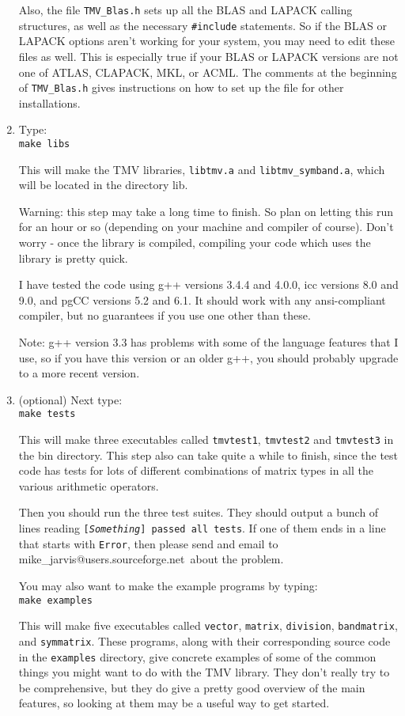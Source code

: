 \documentclass[twoside,letterpaper,11pt]{article}
\makeatletter
\renewcommand{\tt}[1]{{\texttt {#1}}}
\newcommand{\myemail}{mike\_jarvis@users.sourceforge.net}
\makeatother
\begin{document}
\begin{enumerate}
Also, the file \tt{TMV\_Blas.h} sets up all the BLAS and LAPACK calling structures,
as well as the necessary \tt{\#include} statements.  
So if the BLAS or LAPACK options aren't working 
for your system, you may need to edit these files as well.
This is especially true if your BLAS or LAPACK versions are not one of 
ATLAS, CLAPACK, MKL, or ACML.  The comments at the beginning of \tt{TMV\_Blas.h}
gives instructions on how to set up the file for other installations.

\item
Type: \\
\tt{make libs}

This will make the TMV libraries, \tt{libtmv.a} and \tt{libtmv\_symband.a},
which will be located in the directory lib.

Warning: this step may take a long time to finish.  So plan on letting this run
for an hour or so (depending on your machine and compiler of course).
Don't worry - once the library is compiled, compiling your code which uses the 
library is pretty quick.

I have tested the code using g++ versions 3.4.4 and 4.0.0, icc versions
8.0 and 9.0, and pgCC versions 5.2 and 6.1.  It should work with any ansi-compliant
compiler, but no guarantees if you use one other than these. 

Note: g++ version 3.3 has problems with some of the language features that
I use, so if you have this version or an older g++, you should probably
upgrade to a more recent version.

\item
(optional) Next type:\\
\tt{make tests}

This will make three executables called \tt{tmvtest1}, 
\tt{tmvtest2} and \tt{tmvtest3} in the bin directory.
This step also can take quite a while to finish, since the test code has tests
for lots of different combinations of matrix types in all the various 
arithmetic operators.

Then you should run the three test suites.
They should output a bunch of lines reading \tt{[{\em Something}] passed all tests}.
If one of them ends in a line that starts with \tt{Error}, 
then please send and email to \myemail\ about the problem.

You may also want to make the example programs by typing:\\
\tt{make examples}

This will make five executables called \tt{vector}, \tt{matrix}, \tt{division},
\tt{bandmatrix}, and \tt{symmatrix}.
These programs, along with their corresponding source code in the \tt{examples}
directory, give concrete examples of some of the common things you might want
to do with the TMV library.  They don't really try to be comprehensive,
but they do give a pretty good overview of the main features,
so looking at them may be a useful way to get started.


\end{enumerate}
\end{document}
